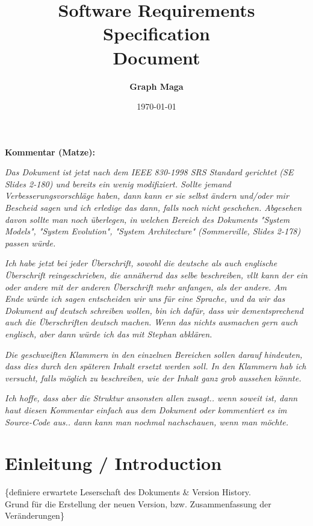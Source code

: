 \documentclass[11pt,a4paper]{article}
\begin{document}
\title{{\LARGE \textbf{Software Requirements Specification}}\\ \textbf{{\large Document}}}
\author{\textbf{Graph Maga}}
\date{\today}
\maketitle

 \tableofcontents{}
 \clearpage
 
{\large \textbf{Kommentar (Matze): }

\textit{Das Dokument ist jetzt nach dem IEEE 830-1998 SRS Standard gerichtet (SE Slides 2-180) und bereits ein wenig modifiziert. Sollte jemand Verbesserungsvorschläge haben, dann kann er sie selbst ändern und/oder mir Bescheid sagen und ich erledige das dann, falls noch nicht geschehen.
Abgesehen davon sollte man noch überlegen, in welchen Bereich des Dokuments "System Models", "System Evolution", "System Architecture" (Sommerville, Slides 2-178) passen würde.}

\textit{Ich habe jetzt bei jeder Überschrift, sowohl die deutsche als auch englische Überschrift reingeschrieben, die annähernd das selbe beschreiben, vllt kann der ein oder andere mit der anderen Überschrift mehr anfangen, als der andere. Am Ende würde ich sagen entscheiden wir uns für eine Sprache, und da wir das Dokument auf deutsch schreiben wollen, bin ich dafür, dass wir dementsprechend auch die Überschriften deutsch machen. Wenn das nichts ausmachen gern auch englisch, aber dann würde ich das mit Stephan abklären.}

\textit{Die geschweiften Klammern in den einzelnen Bereichen sollen darauf hindeuten, dass dies durch den späteren Inhalt ersetzt werden soll. In den Klammern hab ich versucht, falls möglich zu beschreiben, wie der Inhalt ganz grob aussehen könnte.}

\textit{Ich hoffe, dass aber die Struktur ansonsten allen zusagt.. wenn soweit ist, dann haut diesen Kommentar einfach aus dem Dokument oder kommentiert es im Source-Code aus.. dann kann man nochmal nachschauen, wenn man möchte. }


\section{Einleitung / Introduction} %
	\{definiere erwartete Leserschaft des Dokuments \& Version History.\\
    Grund für die Erstellung der neuen Version, bzw. Zusammenfassung der Veränderungen\}
}
\end{document}
